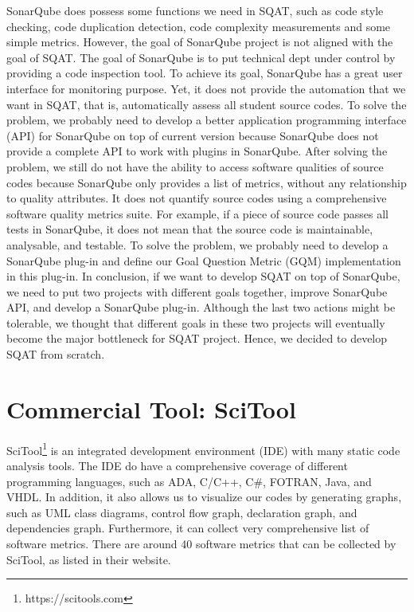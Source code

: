 SonarQube does possess some functions we need in SQAT, such as code style checking, code duplication detection, code complexity measurements and some simple metrics. However, the goal of SonarQube project is not aligned with the goal of SQAT. The goal of SonarQube is to put technical dept under control by providing a code inspection tool. To achieve its goal, SonarQube has a great user interface for monitoring purpose. Yet, it does not provide the automation that we want in SQAT, that is, automatically assess all student source codes. To solve the problem, we probably need to develop a better application programming interface (API) for SonarQube on top of current version because SonarQube does not provide a complete API to work with plugins in SonarQube. After solving the problem, we still do not have the ability to access software qualities of source codes because SonarQube only provides a list of metrics, without any relationship to quality attributes. It does not quantify source codes using a comprehensive software quality metrics suite. For example, if a piece of source code passes all tests in SonarQube, it does not mean that the source code is maintainable, analysable, and testable. To solve the problem, we probably need to develop a SonarQube plug-in and define our Goal Question Metric (GQM) implementation in this plug-in. In conclusion, if we want to develop SQAT on top of SonarQube, we need to put two projects with different goals together, improve SonarQube API, and develop a SonarQube plug-in. Although the last two actions might be tolerable, we thought that different goals in these two projects will eventually become the major bottleneck for SQAT project. Hence, we decided to develop SQAT from scratch.

\section{Commercial Tool: SciTool}

SciTool\footnote{https://scitools.com} is an integrated development environment (IDE) with many static code analysis tools. The IDE do have a comprehensive coverage of different programming languages, such as ADA, C/C++, C\#, FOTRAN, Java, and VHDL. In addition, it also allows us to visualize our codes by generating graphs, such as UML class diagrams, control flow graph, declaration graph, and dependencies graph. Furthermore, it can collect very comprehensive list of software metrics. There are around 40 software metrics that can be collected by SciTool, as listed in their website. 

